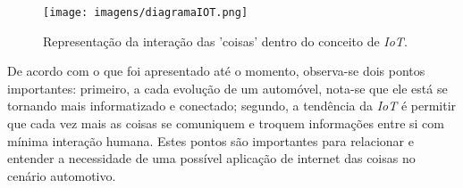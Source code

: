 \begin{figure}[!ht]
\centering
\caption{Representação da interação das 'coisas' dentro do conceito de \textit{IoT}.} 
{\texttt{[image: imagens/diagramaIOT.png]}}\\
 \label{Fig:representacao_iot}
\end{figure}

De acordo com o que foi apresentado até o momento, observa-se dois pontos importantes: primeiro, a cada evolução de um automóvel, nota-se que ele está se tornando mais informatizado e conectado; segundo, a tendência da \textit{IoT} é permitir que cada vez mais as coisas se comuniquem e troquem informações entre si com mínima interação humana. Estes pontos são importantes para relacionar e entender a necessidade de uma possível aplicação de internet das coisas no cenário automotivo.
